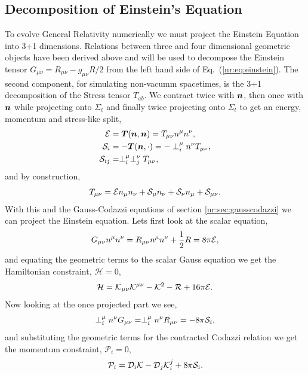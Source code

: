 \subsection{Decomposition of Einstein's Equation} \label{nr:sec:einsteindecomp}
To evolve General Relativity numerically we must project the Einstein Equation into 3+1 dimensions. Relations between three and four dimensional geometric objects have been derived above and will be used to decompose the Einstein tensor $G_{\mu\nu} = R_{\mu\nu}-g_{\mu\nu}R/2$ from the left hand side of Eq.~(\ref{nr:eq:einstein}). The second component, for simulating non-vacumm spacetimes, is the 3+1 decomposition of the Stress tensor $T_{ab}$. We contract twice with $\bs{n}$, then once with $\bs{n}$ while projecting onto $\Sigma_t$ and finally twice projecting onto $\Sigma_t$ to get an energy, momentum and stress-like split,
\begin{align} \mathcal{E} &= \bs{T}(\bs{n},\bs{n}) = T_{\mu \nu}n^\mu n^\nu,\label{nr:eq:Tdecomp1}\\
 \S_i &= -\bs{T}(\bs{n},\cdot) = -\perp_i^\mu  n^\nu T_{\mu \nu}, \label{nr:eq:Tdecomp2}\\
\S_{ij} &= \perp^\mu _i\perp^\nu_j T_{\mu \nu},\label{nr:eq:Tdecomp3}\end{align}
and by construction,
\begin{equation} T_{\mu \nu} = \mathcal{E} n_\mu  n_\nu + \S_\mu  n_\nu + \S_\nu n_\mu  + \S_{\mu \nu}.\end{equation}
With this and the Gauss-Codazzi equations of section \ref{nr:sec:gausscodazzi} we can project the Einstein equation. Lets first look at the scalar equation,
\begin{equation} G_{\mu\nu}n^\mu n^\nu = R_{\mu\nu}n^\mu n^\nu + \frac{1}{2}R = 8\pi \E,\end{equation}
and equating the geometric terms to the scalar Gauss equation we get the Hamiltonian constraint, $\mathcal{H}=0$,
\begin{equation}\mathcal{H} = \K_{\mu\nu}\K^{\mu\nu}-\K^2 -\R + 16\pi \E  .\end{equation}
Now looking at the once projected part we see,
\begin{equation} \perp^\mu_i n^\nu G_{\mu\nu} =  \perp^\mu_i n^\nu R_{\mu\nu} = -8\pi\S_i,\end{equation}
and substituting the geometric terms for the contracted Codazzi relation we get the momentum constraint, $\mathcal{P}_i = 0$,
\begin{equation} \mathcal{P}_i = \D_i \K - \D_j\K^j_i  + 8\pi \S_i.\end{equation}
